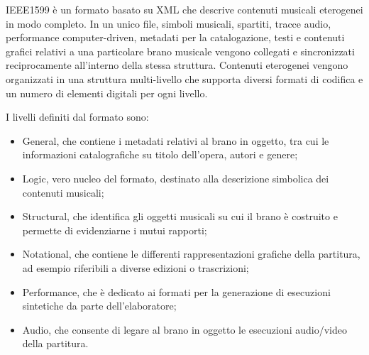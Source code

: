 \documentclass[12pt,italian]{report}
\begin{document}
IEEE1599  \`e un formato basato su XML che descrive contenuti musicali eterogenei in modo completo. In un unico file, simboli musicali, spartiti, tracce audio, performance computer-driven, metadati per la catalogazione, testi e contenuti grafici relativi a una particolare brano musicale vengono collegati e  sincronizzati reciprocamente all'interno della stessa struttura. Contenuti eterogenei vengono organizzati in una struttura multi-livello che supporta diversi formati di codifica e un numero di elementi digitali per ogni livello.~\cite{ludovico2008key}

I livelli definiti dal formato sono:~\cite{barate2010tecnologie}
\begin{itemize}
	\item General, che contiene i metadati relativi al brano in oggetto, tra cui le informazioni catalografiche su titolo dell’opera, autori e genere;
	\item Logic, vero nucleo del formato, destinato alla descrizione simbolica dei contenuti musicali;
	\item Structural, che identifica gli oggetti musicali su cui il brano \`e costruito e permette di evidenziarne i mutui rapporti;
	\item Notational, che contiene le differenti rappresentazioni grafiche della partitura, ad esempio riferibili a diverse edizioni o trascrizioni;
	\item Performance, che  \`e dedicato ai formati per la generazione di esecuzioni sintetiche da parte dell’elaboratore;
	\item Audio, che consente di legare al brano in oggetto le esecuzioni audio/video della partitura.
\end{itemize}
\end{document}

